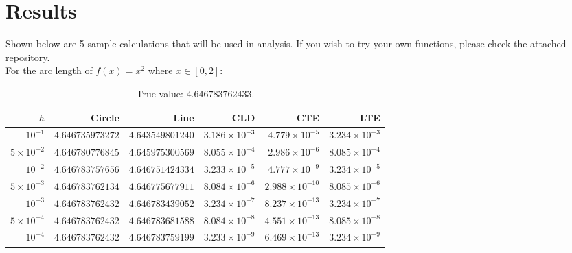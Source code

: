 \documentclass{article}
\begin{document}
\newpage

\section{Results}

Shown below are 5 sample calculations that will be used in analysis. If you wish to try your own functions, please check the attached repository.
\\

For the arc length of $f(x)=x^2$ where $x\in[0,2]$:
\begin{table}[h]
\centering
\begin{tabular}{rrrrrr}
\hline
$h$ & Circle & Line & CLD & CTE & LTE\\
\hline
$10^{-1}$ & $4.646735973272$ & $4.643549801240$ & $3.186\times10^{-3}$ & $4.779\times10^{-5}$ & $3.234\times10^{-3}$\\
$5\times10^{-2}$ & $4.646780776845$ & $4.645975300569$ & $8.055\times10^{-4}$ & $2.986\times10^{-6}$ & $8.085\times10^{-4}$\\
$10^{-2}$ & $4.646783757656$ & $4.646751424334$ & $3.233\times10^{-5}$ & $4.777\times10^{-9}$ & $3.234\times10^{-5}$\\
$5\times10^{-3}$ & $4.646783762134$ & $4.646775677911$ & $8.084\times10^{-6}$ & $2.988\times10^{-10}$ & $8.085\times10^{-6}$\\
$10^{-3}$ & $4.646783762432$ & $4.646783439052$ & $3.234\times10^{-7}$ & $8.237\times10^{-13}$ & $3.234\times10^{-7}$\\
$5\times10^{-4}$ & $4.646783762432$ & $4.646783681588$ & $8.084\times10^{-8}$ & $4.551\times10^{-13}$ & $8.085\times10^{-8}$\\
$10^{-4}$ & $4.646783762432$ & $4.646783759199$ & $3.233\times10^{-9}$ & $6.469\times10^{-13}$ & $3.234\times10^{-9}$\\
\hline
\end{tabular}
\caption{True value: $4.646783762433$.}
\end{table}
\\
\end{document}

